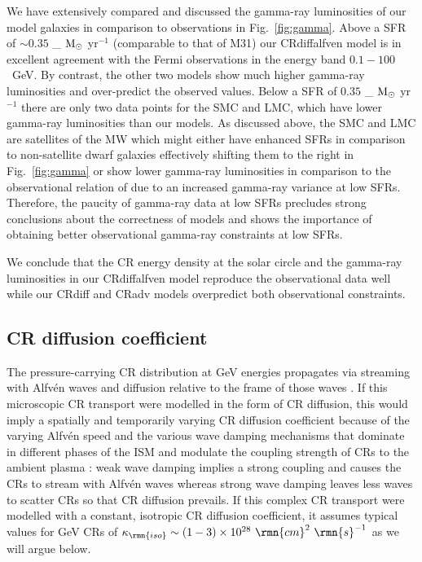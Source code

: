 \documentclass[useAMS,usenatbib]{mnras}
\newcommand{\Msun}{{\ifmmode{{\rm M}_{\odot}}\else{${\rm M}_{\odot}$}\fi}}
\def \Msun {\ifmmode {\rm M}_{\odot} \else ${\rm M}_{\odot}$ \fi}
\begin{document}
We have extensively compared and discussed the gamma-ray luminosities of our model galaxies in comparison to observations in Fig.\ \ref{fig:gamma}. Above a SFR of $\sim 0.35$ \Msun yr$^{-1}$ (comparable to that of M31) our CRdiffalfven model is in excellent agreement with the Fermi observations in the energy band $0.1-100$~GeV. By contrast, the other two models show much higher gamma-ray luminosities and over-predict the observed values. Below a SFR of $0.35$ \Msun yr$^{-1}$ there are only two data points for the SMC and LMC, which have lower gamma-ray luminosities than our models. As discussed above, the SMC and LMC are satellites of the MW which might either have enhanced SFRs in comparison to non-satellite dwarf galaxies  \citep{Harris2009} effectively shifting them to the right in Fig.\ \ref{fig:gamma} or show lower gamma-ray luminosities in comparison to the observational relation of \citet{Rojas-Bravo2016} due to an increased gamma-ray variance at low SFRs. Therefore, the paucity of gamma-ray data at low SFRs precludes strong conclusions about the correctness of models and shows the importance of obtaining better observational gamma-ray constraints at low SFRs.

We conclude that the CR energy density at the solar circle and the gamma-ray luminosities in our CRdiffalfven model reproduce the observational data well while our CRdiff and CRadv models overpredict both observational constraints.

\subsection{CR diffusion coefficient}
\label{sec:kappa}

The pressure-carrying CR distribution at GeV energies propagates via streaming with Alfv\'en waves and diffusion relative to the frame of those waves \citep{Kulsrud1969,Amato2018,Thomas2020}. If this microscopic CR transport were modelled in the form of CR diffusion, this would imply a spatially and temporarily varying CR diffusion coefficient because of the varying Alfv\'en speed and the various wave damping mechanisms that dominate in different phases of the ISM and modulate the coupling strength of CRs to the ambient plasma \citep{Jiang2018,Thomas2019}: weak wave damping implies a strong coupling and causes the CRs to stream with Alfv\'en waves whereas strong wave damping leaves less waves to scatter CRs so that CR diffusion prevails. If this complex CR transport were modelled with a constant, isotropic CR diffusion coefficient, it assumes typical values for GeV CRs of $\kappa_\rmn{iso}\sim(1-3)\times10^{28}~\rmn{cm}^2~\rmn{s}^{-1}$ as we will argue below.
\end{document}
